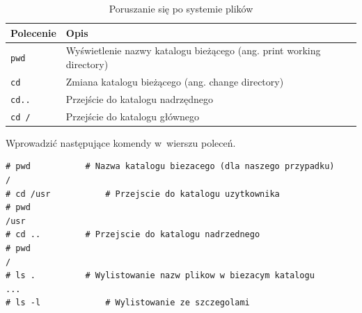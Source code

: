 \begin{example}
\begin{example}
\begin{table}[h!]
\centering
\caption{Poruszanie się po systemie plików}
\setlength{\arrayrulewidth}{1pt}
\setlength{\tabcolsep}{6pt}
\renewcommand{\arraystretch}{1.2}
\begin{tabular}{ |p{}|p{}|}
\hline \rowcolor{gray}
\textbf{Polecenie} & \textbf{Opis} \\ \hline
\mbox{\lstinline[style=MyBashStyle]{pwd}} & Wyświetlenie nazwy katalogu bieżącego (ang. print working directory) \\ \hline 
\mbox{\lstinline[style=MyBashStyle]{cd}}  & Zmiana katalogu bieżącego (ang. change directory) \\ \hline
\mbox{\lstinline[style=MyBashStyle]{cd..}} & Przejście do katalogu nadrzędnego \\ \hline 
\mbox{\lstinline[style=MyBashStyle]{cd /}} & Przejście do katalogu głównego \\ \hline 
\end{tabular}
\label{tab:poruszanie}
\end{table}
\end{example}



Wprowadzić następujące komendy w~wierszu poleceń. 

\begin{lstlisting}[style=MyBashStyle]
# pwd			# Nazwa katalogu biezacego (dla naszego przypadku) 
/ 
# cd /usr			# Przejscie do katalogu uzytkownika
# pwd 
/usr 
# cd ..			# Przejscie do katalogu nadrzednego 
# pwd
/
# ls .			# Wylistowanie nazw plikow w biezacym katalogu 
...
# ls -l 			# Wylistowanie ze szczegolami
\end{lstlisting}
\end{example}


